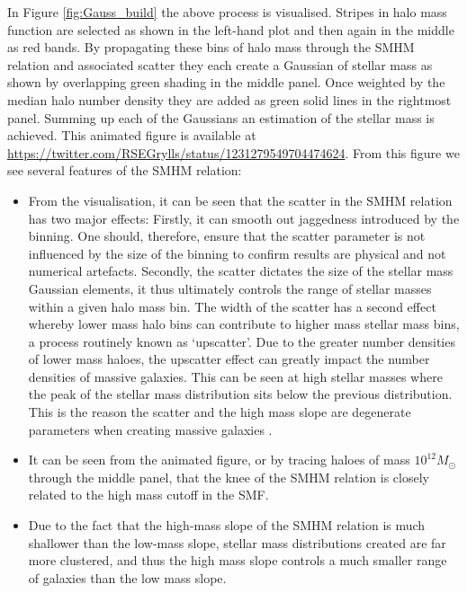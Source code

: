 In Figure \ref{fig:Gauss_build} the above process is visualised. Stripes in halo mass function are selected as shown in the left-hand plot and then again in the middle as red bands. By propagating these bins of halo mass through the SMHM relation and associated scatter they each create a Gaussian of stellar mass as shown by overlapping green shading in the middle panel. Once weighted by the median halo number density they are added as green solid lines in the rightmost panel. Summing up each of the Gaussians an estimation of the stellar mass is achieved. This animated figure is available at \url{https://twitter.com/RSEGrylls/status/1231279549704474624}. From this figure we see several features of the SMHM relation:
\begin{itemize}
    \item From the visualisation, it can be seen that the scatter in the SMHM relation has two major effects: Firstly, it can smooth out jaggedness introduced by the binning. One should, therefore, ensure that the scatter parameter is not influenced by the size of the binning to confirm results are physical and not numerical artefacts. Secondly, the scatter dictates the size of the stellar mass Gaussian elements, it thus ultimately controls the range of stellar masses within a given halo mass bin. The width of the scatter has a second effect whereby lower mass halo bins can contribute to higher mass stellar mass bins, a process routinely known as `upscatter'. Due to the greater number densities of lower mass haloes, the upscatter effect can greatly impact the number densities of massive galaxies. This can be seen at high stellar masses where the peak of the stellar mass distribution sits below the previous distribution. This is the reason the scatter and the high mass slope are degenerate parameters when creating massive galaxies \cite{Shankar2014ON1}.
    \item It can be seen from the animated figure, or by tracing haloes of mass $10^{12} M_{\odot}$ through the middle panel, that the knee of the SMHM relation is closely related to the high mass cutoff in the SMF.
    \item Due to the fact that the high-mass slope of the SMHM relation is much shallower than the low-mass slope, stellar mass distributions created are far more clustered, and thus the high mass slope controls a much smaller range of galaxies than the low mass slope.
\end{itemize}

